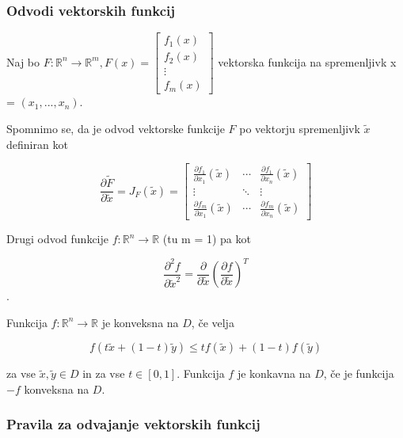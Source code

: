 \documentclass{article}
\begin{document}
\begin{multicols}{2}
	\subsubsection{Odvodi vektorskih funkcij}
	Naj bo \( F: \mathbb{R}^n \rightarrow \mathbb{R}^m, F(x) =
	\begin{bmatrix}
		f_1(x) \\
		f_2(x) \\
		\vdots \\
		f_m(x)
	\end{bmatrix} \)
	vektorska funkcija na spremenljivk x = \( (x_1, ..., x_n) \).

	Spomnimo se, da je odvod vektorske funkcije \( F \) po vektorju spremenljivk \( \tilde{x} \) definiran kot

	\[
		\frac{\partial \tilde{F}}{\partial \tilde{x}} = J_F(\tilde{x}) =
		\begin{bmatrix}
			\frac{\partial f_1}{\partial x_1} (\tilde{x}) & \cdots & \frac{\partial f_1}{\partial x_n} (\tilde{x}) \\
			\vdots                                        & \ddots & \vdots                                        \\
			\frac{\partial f_m}{\partial x_1} (\tilde{x}) & \cdots & \frac{\partial f_m}{\partial x_n} (\tilde{x})
		\end{bmatrix}
	\]

	Drugi odvod funkcije \( f: \mathbb{R}^n \rightarrow \mathbb{R} \) (tu m = 1) pa kot

	\[
		\frac{\partial^2 f}{\partial \tilde{x}^2} = \frac{\partial}{\partial \tilde{x}} \left( \frac{\partial f}{\partial \tilde{x}} \right)^T
	\].

	Funkcija \( f: \mathbb{R}^n \rightarrow \mathbb{R} \) je konveksna na \( D \), če velja

	\[
		f(t \tilde{x} + (1-t) \tilde{y}) \leq t f(\tilde{x}) + (1-t) f(\tilde{y})
	\]

	za vse \( \tilde{x}, \tilde{y} \in D \) in za vse \( t \in [0, 1] \). Funkcija \( f \) je konkavna na \( D \), če je funkcija \( -f \) konveksna na \( D \).

	\subsubsection{Pravila za odvajanje vektorskih funkcij}


\end{multicols}
\end{document}
